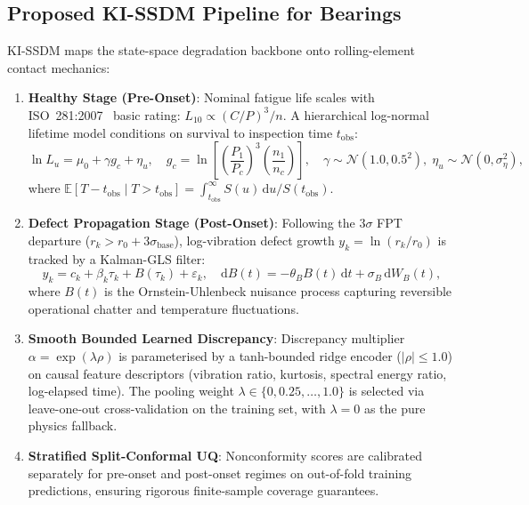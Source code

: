 \documentclass[11pt,a4paper]{article}
\begin{document}
\subsection{Proposed KI-SSDM Pipeline for Bearings}
KI-SSDM maps the state-space degradation backbone onto rolling-element contact mechanics:
\begin{enumerate}[label=(\arabic*),leftmargin=2.2em]
    \item \textbf{Healthy Stage (Pre-Onset)}: Nominal fatigue life scales with ISO~281:2007~\cite{ISO_281} basic rating: $L_{10} \propto (C/P)^3 / n$. A hierarchical log-normal lifetime model conditions on survival to inspection time $t_{\mathrm{obs}}$:
    \begin{equation}
        \ln L_u = \mu_0 + \gamma g_c + \eta_u, \quad g_c = \ln\left[\left(\frac{P_1}{P_c}\right)^3 \left(\frac{n_1}{n_c}\right)\right], \quad \gamma \sim \mathcal{N}(1.0, 0.5^2), \; \eta_u \sim \mathcal{N}(0, \sigma_\eta^2),
    \end{equation}
    where $\mathbb{E}[T - t_{\mathrm{obs}} \mid T > t_{\mathrm{obs}}] = \int_{t_{\mathrm{obs}}}^\infty S(u)\,\mathrm{d}u / S(t_{\mathrm{obs}})$.
    \item \textbf{Defect Propagation Stage (Post-Onset)}: Following the $3\sigma$ FPT departure ($r_k > r_0 + 3\sigma_{\mathrm{base}}$), log-vibration defect growth $y_k = \ln(r_k / r_0)$ is tracked by a Kalman-GLS filter:
    \begin{equation}
        y_k = c_k + \beta_k \tau_k + B(\tau_k) + \varepsilon_k, \quad \mathrm{d}B(t) = -\theta_B B(t)\,\mathrm{d}t + \sigma_B\,\mathrm{d}W_B(t),
    \end{equation}
    where $B(t)$ is the Ornstein-Uhlenbeck nuisance process capturing reversible operational chatter and temperature fluctuations.
    \item \textbf{Smooth Bounded Learned Discrepancy}: Discrepancy multiplier $\alpha = \exp(\lambda \rho)$ is parameterised by a tanh-bounded ridge encoder ($|\rho| \le 1.0$) on causal feature descriptors (vibration ratio, kurtosis, spectral energy ratio, log-elapsed time). The pooling weight $\lambda \in \{0, 0.25, \dots, 1.0\}$ is selected via leave-one-out cross-validation on the training set, with $\lambda = 0$ as the pure physics fallback.
    \item \textbf{Stratified Split-Conformal UQ}: Nonconformity scores are calibrated separately for pre-onset and post-onset regimes on out-of-fold training predictions, ensuring rigorous finite-sample coverage guarantees.
\end{enumerate}
\end{document}
